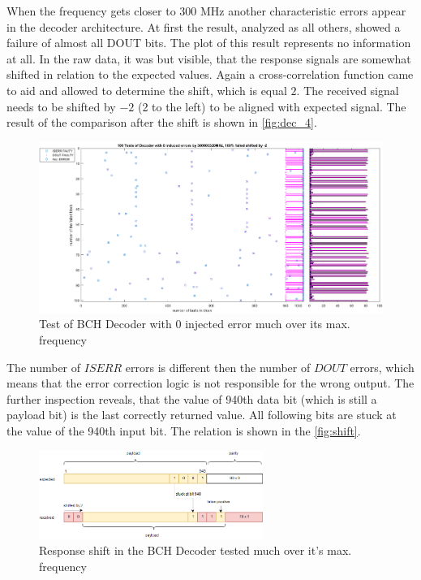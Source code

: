 When the frequency gets closer to 300 MHz another characteristic errors appear in the decoder architecture. At first the result, analyzed as all others, showed a failure of almost all DOUT bits. The plot of this result represents no information at all. In the raw data, it was but visible, that the response signals are somewhat shifted in relation to the expected values. Again a cross-correlation function came to aid and allowed to determine the shift, which is equal $2$. The received signal needs to be shifted by $-2$ (2 to the left) to be aligned with expected signal. The result of the comparison after the shift is shown in \autoref{fig:dec_4}. 

\begin{figure}[h]
\centering
\includegraphics[width=\textwidth]{figures/100_tests_0_faults_300_MHz_shift_2.png}
\caption{Test of BCH Decoder with 0 injected error much over its max. frequency}
\label{fig:dec_4}
\end{figure}

The number of $ISERR$ errors is different then the number of $DOUT$ errors, which means that the error correction logic is not responsible for the wrong output. The further inspection reveals, that the value of 940th data bit (which is still a payload bit) is the last correctly returned value. All following bits are stuck at the value of the 940th input bit. The relation is shown in the \autoref{fig:shift}.

\begin{figure}[h]
\centering
\includegraphics[width=0.65\textwidth]{figures/decoder_parity.png}
\caption{Response shift in the BCH Decoder tested much over it's max. frequency}
\label{fig:shift}
\end{figure}

